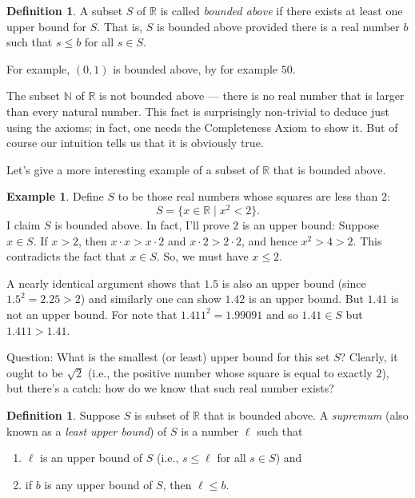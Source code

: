 \documentclass[12pt]{amsart}
\newcommand{\R}{{\mathbb{R}}}
\newcommand{\N}{\mathbb{N}}
\numberwithin{equation}{section}
\theoremstyle{plain} %
\theoremstyle{definition}
\newtheorem{defn}[equation]{Definition}
\newtheorem{ex}[equation]{Example}
\theoremstyle{remark}
\begin{document}
\begin{defn} A subset $S$ of $\R$ is called {\em bounded above} if there exists at least one upper bound for $S$. That is, $S$ is bounded above provided there
  is a real number $b$ such that $s \leq b$ for all $s \in S$.
\end{defn}

For example, $(0,1)$ is bounded above, by for example $50$.  

The subset $\N$ of $\R$ is not bounded above --- there is no real
number that is larger than every natural number. This  fact is surprisingly non-trivial to deduce just using
the axioms; in fact, one needs the Completeness Axiom to show it.  But of course our intuition tells us that it is obviously true. 


Let's give a more interesting example of a subset of $\R$ that is bounded above.  

\begin{ex}
Define $S$ to be those real numbers whose squares are less than $2$:
$$
S = \{x \in \R \mid x^2 < 2\}.
$$
I claim $S$ is bounded above. In fact, I'll prove $2$ is an upper
bound: Suppose $x \in S$. If $x > 2$, then $x \cdot x > x \cdot 2$ and $x \cdot 2 > 2 \cdot 2$, and hence $x^2 > 4 > 2$. This contradicts the fact that $x \in
S$. So, we must have $x \leq 2$.

A nearly identical argument shows that $1.5$ is also an upper bound (since $1.5^2 = 2.25 > 2$) and similarly one can show $1.42$ is an upper bound.  
But $1.41$ is not an upper bound.  For note that $1.411^2 = 1.99091$ and so $1.41 \in S$ but $1.411 > 1.41$. 

Question: What is the smallest (or least) upper bound for this set $S$? Clearly, it ought to be $\sqrt{2}$ (i.e., the positive number whose square is equal
to exactly $2$), but there's a catch: how do we know that such real number exists?
\end{ex}


\begin{defn} Suppose $S$ is subset of $\R$ that is bounded above. A {\em supremum} (also known as a {\em least upper bound}) of $S$ is a number $\ell$ such that
\begin{enumerate}
\item $\ell$ is an upper bound of $S$ (i.e., $s \leq \ell$ for all $s \in S$) and
\item if $b$ is any upper bound of $S$, then $\ell \leq b$. 
\end{enumerate}
\end{defn}
\end{document}
